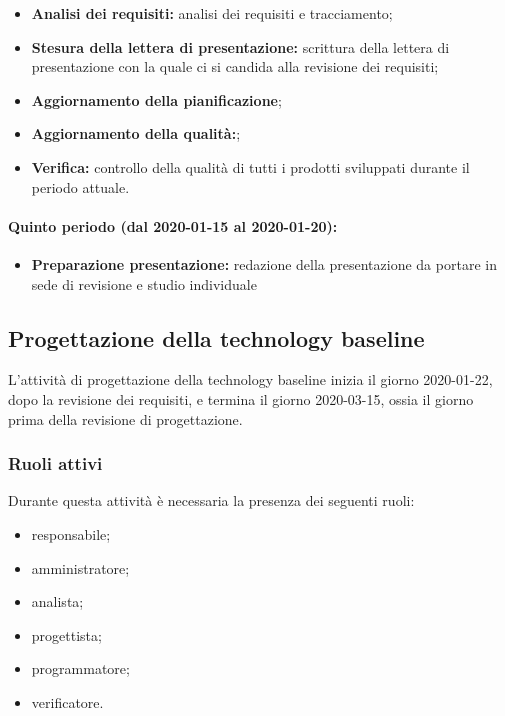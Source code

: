 				\begin{itemize}
					\item \textbf{Analisi dei requisiti:} analisi dei requisiti e tracciamento;
					\item \textbf{Stesura della lettera di presentazione:} scrittura della lettera di presentazione con la quale ci si candida alla revisione dei requisiti;
					\item \textbf{Aggiornamento della pianificazione};
					\item \textbf{Aggiornamento della qualità:};
					\item \textbf{Verifica:} controllo della qualità di tutti i prodotti sviluppati durante il periodo attuale.
				\end{itemize}
			
			\paragraph{Quinto periodo (dal 2020-01-15 al 2020-01-20):}
			
				\begin{itemize}
					\item \textbf{Preparazione presentazione:} redazione della presentazione da portare in sede di revisione e studio individuale
				\end{itemize}

		\subsection{Progettazione della technology baseline}
	
			L'attività di progettazione della technology baseline inizia il giorno 2020-01-22, dopo la revisione dei requisiti, e termina il giorno 2020-03-15, ossia il giorno prima della revisione di progettazione.
			
			\subsubsection{Ruoli attivi}
			
				Durante questa attività è necessaria la presenza dei seguenti ruoli:
				\begin{itemize}
					\item responsabile;
					\item amministratore;
					\item analista;
					\item progettista;
					\item programmatore;
					\item verificatore.
				\end{itemize}
			

